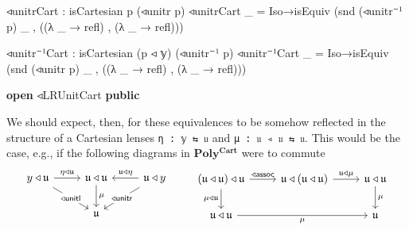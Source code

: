 \documentclass[
  11pt,
  oneside,
  article]{memoir}
\newenvironment{Shaded}{}{}
\newcommand{\KeywordTok}[1]{\textcolor[rgb]{0.00,0.44,0.13}{\textbf{#1}}}
\newcommand{\NormalTok}[1]{#1}
\newcommand{\OtherTok}[1]{\textcolor[rgb]{0.00,0.44,0.13}{#1}}
\theoremstyle{definition}
\theoremstyle{plain}
\newcommand{\0}{\textsf{0}}
\newcommand{\1}{\tn{\textsf{1}}}
\begin{document}
\begin{Shaded}
\begin{Highlighting}[]
\NormalTok{    ◃unitrCart }\OtherTok{:}\NormalTok{ isCartesian p }\OtherTok{(}\NormalTok{◃unitr p}\OtherTok{)}
\NormalTok{    ◃unitrCart }\OtherTok{\_} \OtherTok{=}\NormalTok{ Iso→isEquiv }\OtherTok{(}\NormalTok{snd }\OtherTok{(}\NormalTok{◃unitr⁻¹ p}\OtherTok{)} \OtherTok{\_}\NormalTok{ , }\OtherTok{((λ} \OtherTok{\_} \OtherTok{→}\NormalTok{ refl}\OtherTok{)}\NormalTok{ , }\OtherTok{(λ} \OtherTok{\_} \OtherTok{→}\NormalTok{ refl}\OtherTok{)))}

\NormalTok{    ◃unitr⁻¹Cart }\OtherTok{:}\NormalTok{ isCartesian }\OtherTok{(}\NormalTok{p ◃ 𝕪}\OtherTok{)} \OtherTok{(}\NormalTok{◃unitr⁻¹ p}\OtherTok{)}
\NormalTok{    ◃unitr⁻¹Cart }\OtherTok{\_} \OtherTok{=}\NormalTok{ Iso→isEquiv }\OtherTok{(}\NormalTok{snd }\OtherTok{(}\NormalTok{◃unitr p}\OtherTok{)} \OtherTok{\_}\NormalTok{ , }\OtherTok{((λ} \OtherTok{\_} \OtherTok{→}\NormalTok{ refl}\OtherTok{)}\NormalTok{ , }\OtherTok{(λ} \OtherTok{\_} \OtherTok{→}\NormalTok{ refl}\OtherTok{)))}

\KeywordTok{open}\NormalTok{ ◃LRUnitCart }\KeywordTok{public}
\end{Highlighting}
\end{Shaded}

We should expect, then, for these equivalences to be somehow reflected
in the structure of a Cartesian lenses \texttt{η\ :\ 𝕪\ ⇆\ 𝔲} and
\texttt{μ\ :\ 𝔲\ ◃\ 𝔲\ ⇆\ 𝔲}. This would be the case, e.g., if the
following diagrams in \(\mathbf{Poly^{Cart}}\) were to commute \[
\begin{tikzcd}
    {y \triangleleft \mathfrak{u}} & {\mathfrak{u} \triangleleft \mathfrak{u} } & {\mathfrak{u} \triangleleft y} \\
    & {\mathfrak{u}}
    \arrow["{\eta \triangleleft \mathfrak{u}}", from=1-1, to=1-2]
    \arrow["{\mathsf{\triangleleft unitl}}"{description}, from=1-1, to=2-2]
    \arrow["\mu", from=1-2, to=2-2]
    \arrow["{\mathfrak{u} \triangleleft \eta}"', from=1-3, to=1-2]
    \arrow["{\mathsf{\triangleleft unitr}}"{description}, from=1-3, to=2-2]
\end{tikzcd} \qquad \begin{tikzcd}
    {(\mathfrak{u} \triangleleft \mathfrak{u}) \triangleleft \mathfrak{u}} & {\mathfrak{u} \triangleleft (\mathfrak{u} \triangleleft \mathfrak{u})} & {\mathfrak{u} \triangleleft \mathfrak{u}} \\
    {\mathfrak{u} \triangleleft \mathfrak{u}} && {\mathfrak{u}}
    \arrow["{\mathsf{\triangleleft assoc}}", from=1-1, to=1-2]
    \arrow["{\mu \triangleleft \mathfrak{u}}"', from=1-1, to=2-1]
    \arrow["{\mathfrak{u} \triangleleft \mu}", from=1-2, to=1-3]
    \arrow["\mu", from=1-3, to=2-3]
    \arrow["\mu"', from=2-1, to=2-3]
\end{tikzcd}
\]
\end{document}
